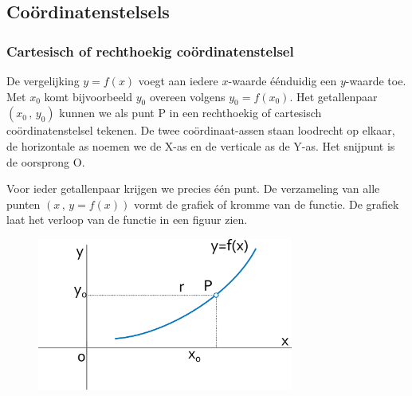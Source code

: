 


\subsection{Co\"ordinatenstelsels}


\subsubsection{Cartesisch of rechthoekig co\"ordinatenstelsel}

De vergelijking $y=f(x)$ voegt aan iedere $x$-waarde \'e\'enduidig een
$y$-waarde toe. Met $x_{0}$ komt bijvoorbeeld $y_{0}$ overeen volgens
$y_{0}=f(x_{0})$. Het getallenpaar $(x_{0}\,,\,y_{0})$ kunnen we
als punt P in een rechthoekig of cartesisch co\"ordinatenstelsel tekenen.
De twee co\"ordinaat-assen staan loodrecht op elkaar, de horizontale
as noemen we de X-as en de verticale as de Y-as. Het snijpunt is de
oorsprong O.

\noindent Voor ieder getallenpaar krijgen we precies \'e\'en punt. De
verzameling van alle punten $(x\,,\,y=f(x))$ vormt de grafiek of
kromme van de functie. De grafiek laat het verloop van de functie
in een figuur zien.

\begin{figure}
\centering
\includegraphics[height=5cm]{2_elem_rekenvaardigheden_B/inputs/figuur10}
\end{figure}

